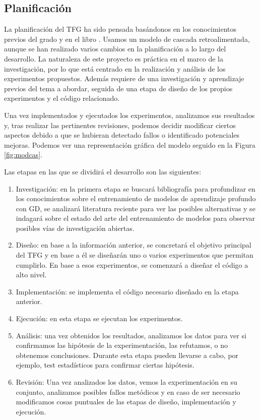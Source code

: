 \subsection{Planificación}

La planificación del TFG ha sido pensada basándonos en los conocimientos previos del grado y en el libro \cite{IngSoft}. Usamos un modelo de cascada retroalimentada, aunque se han realizado varios cambios en la planificación a lo largo del desarrollo. La naturaleza de este proyecto es práctica en el marco de la investigación, por lo que está centrado en la realización y análisis de los experimentos propuestos. Además requiere de una investigación y aprendizaje previos del tema a abordar, seguida de una etapa de diseño de los propios experimentos y el código relacionado.

Una vez implementados y ejecutados los experimentos, analizamos sus resultados y, tras realizar las pertinentes revisiones, podemos decidir modificar ciertos aspectos debido a que se hubieran detectado fallos o identificado potenciales mejoras. Podemos ver una representación gráfica del modelo seguido en la Figura \ref{fig:modcas}.


Las etapas en las que se dividirá el desarrollo son las siguientes:

\begin{enumerate}

\item Investigación: en la primera etapa se buscará bibliografía para profundizar en los conocimientos sobre el entrenamiento de modelos de aprendizaje profundo con GD, se analizará literatura reciente para ver las posibles alternativas y se indagará sobre el estado del arte del entrenamiento de modelos para observar posibles vías de investigación abiertas.

\item Diseño: en base a la información anterior, se concretará el objetivo principal del TFG y en base a él se diseñarán uno o varios experimentos que permitan cumplirlo. En base a esos experimentos, se comenzará a diseñar el código a alto nivel.

\item Implementación: se implementa el código necesario diseñado en la etapa anterior.

\item Ejecución: en esta etapa se ejecutan los experimentos.

\item Análisis: una vez obtenidos los resultados, analizamos los datos para ver si confirmamos las hipótesis de la experimentación, las refutamos, o no obtenemos conclusiones. Durante esta etapa pueden llevarse a cabo, por ejemplo, test estadísticos para confirmar ciertas hipótesis.

\item Revisión: Una vez analizados los datos, vemos la experimentación en su conjunto, analizamos posibles fallos metódicos y en caso de ser necesario modificamos cosas puntuales de las etapas de diseño, implementación y ejecución.

\end{enumerate}


